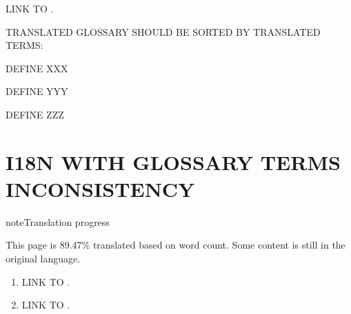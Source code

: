 \documentclass[letterpaper,10pt,english]{sphinxmanual}
\begin{document}
\sphinxAtStartPar
LINK TO {\hyperref[\detokenize{glossary_terms:term-Some-term}]{}}.

\sphinxAtStartPar
TRANSLATED GLOSSARY SHOULD BE SORTED BY TRANSLATED TERMS:
\begin{description}
\sphinxAtStartPar
DEFINE XXX

\sphinxAtStartPar
DEFINE YYY

\sphinxAtStartPar
DEFINE ZZZ

\end{description}

\sphinxstepscope


\chapter{I18N WITH GLOSSARY TERMS INCONSISTENCY}
\label{\detokenize{glossary_terms_inconsistency:i18n-with-glossary-terms-inconsistency}}\label{\detokenize{glossary_terms_inconsistency::doc}}
\begin{sphinxadmonition}{note}{Translation progress}

\sphinxAtStartPar
This page is 89.47\% translated based on word count. Some content is still in the original language.
\end{sphinxadmonition}
\begin{enumerate}
%
\item {} 
\sphinxAtStartPar
LINK TO {\hyperref[\detokenize{glossary_terms:term-Some-term}]{}}.

\item {} 
\sphinxAtStartPar
LINK TO .

\end{enumerate}
\end{document}
